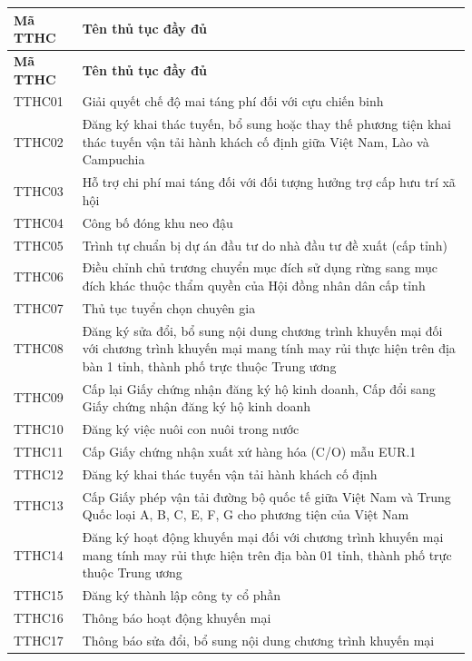 \renewcommand{\arraystretch}{1.25}
\begin{longtable}{|>{\centering\arraybackslash}p{2.3cm}|p{12.6cm}|}
\hline
\textbf{Mã TTHC} & \textbf{Tên thủ tục đầy đủ} \\ \hline
\endfirsthead
\hline
\textbf{Mã TTHC} & \textbf{Tên thủ tục đầy đủ} \\ \hline
\endhead
TTHC01 & Giải quyết chế độ mai táng phí đối với cựu chiến binh \\ \hline
TTHC02 & Đăng ký khai thác tuyến, bổ sung hoặc thay thế phương tiện khai thác tuyến vận tải hành khách cố định giữa Việt Nam, Lào và Campuchia \\ \hline
TTHC03 & Hỗ trợ chi phí mai táng đối với đối tượng hưởng trợ cấp hưu trí xã hội \\ \hline
TTHC04 & Công bố đóng khu neo đậu \\ \hline
TTHC05 & Trình tự chuẩn bị dự án đầu tư do nhà đầu tư đề xuất (cấp tỉnh) \\ \hline
TTHC06 & Điều chỉnh chủ trương chuyển mục đích sử dụng rừng sang mục đích khác thuộc thẩm quyền của Hội đồng nhân dân cấp tỉnh \\ \hline
TTHC07 & Thủ tục tuyển chọn chuyên gia \\ \hline
TTHC08 & Đăng ký sửa đổi, bổ sung nội dung chương trình khuyến mại đối với chương trình khuyến mại mang tính may rủi thực hiện trên địa bàn 1 tỉnh, thành phố trực thuộc Trung ương \\ \hline
TTHC09 & Cấp lại Giấy chứng nhận đăng ký hộ kinh doanh, Cấp đổi sang Giấy chứng nhận đăng ký hộ kinh doanh \\ \hline
TTHC10 & Đăng ký việc nuôi con nuôi trong nước \\ \hline
TTHC11 & Cấp Giấy chứng nhận xuất xứ hàng hóa (C/O) mẫu EUR.1 \\ \hline
TTHC12 & Đăng ký khai thác tuyến vận tải hành khách cố định \\ \hline
TTHC13 & Cấp Giấy phép vận tải đường bộ quốc tế giữa Việt Nam và Trung Quốc loại A, B, C, E, F, G cho phương tiện của Việt Nam \\ \hline
TTHC14 & Đăng ký hoạt động khuyến mại đối với chương trình khuyến mại mang tính may rủi thực hiện trên địa bàn 01 tỉnh, thành phố trực thuộc Trung ương \\ \hline
TTHC15 & Đăng ký thành lập công ty cổ phần \\ \hline
TTHC16 & Thông báo hoạt động khuyến mại \\ \hline
TTHC17 & Thông báo sửa đổi, bổ sung nội dung chương trình khuyến mại \\ \hline

\end{longtable}
